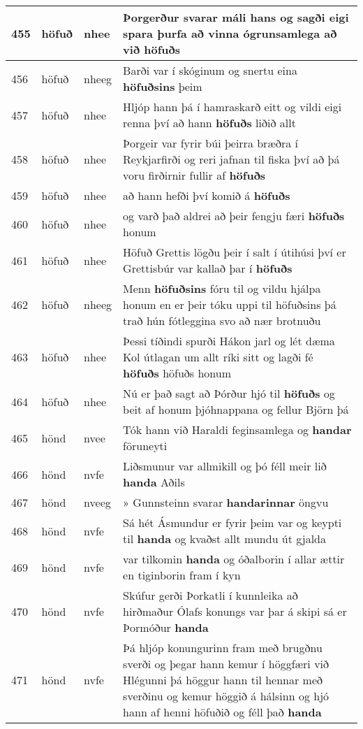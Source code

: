 \documentclass{article}
\begin{document}
\begin{longtable}{p{1cm}|p{1cm}|p{1cm}|p{13cm}}
\hline
455&höfuð&nhee&Þorgerður svarar máli hans og sagði eigi spara þurfa að vinna ógrunsamlega að við \textbf{höfuðs} \\
\hline
456&höfuð&nheeg&Barði var í skóginum og snertu eina \textbf{höfuðsins} þeim\\
\hline
457&höfuð&nhee&Hljóp hann þá í hamraskarð eitt og vildi eigi renna því að hann \textbf{höfuðs} liðið allt\\
\hline
458&höfuð&nhee&Þorgeir var fyrir búi þeirra bræðra í Reykjarfirði og reri jafnan til fiska því að þá voru firðirnir fullir af \textbf{höfuðs} \\
\hline
459&höfuð&nhee&að hann hefði því komið á \textbf{höfuðs} \\
\hline
460&höfuð&nhee&og varð það aldrei að þeir fengju færi \textbf{höfuðs} honum\\
\hline
461&höfuð&nhee&Höfuð Grettis lögðu þeir í salt í útihúsi því er Grettisbúr var kallað þar í \textbf{höfuðs} \\
\hline
462&höfuð&nheeg&Menn \textbf{höfuðsins} fóru til og vildu hjálpa honum en er þeir tóku uppi til höfuðsins þá trað hún fótleggina svo að nær brotnuðu\\
\hline
463&höfuð&nhee&Þessi tíðindi spurði Hákon jarl og lét dæma Kol útlagan um allt ríki sitt og lagði fé \textbf{höfuðs} höfuðs honum\\
\hline
464&höfuð&nhee&Nú er það sagt að Þórður hjó til \textbf{höfuðs} og beit af honum þjóhnappana og fellur Björn þá\\
\hline
465&hönd&nvee&Tók hann við Haraldi feginsamlega og \textbf{handar} föruneyti\\
\hline
466&hönd&nvfe&Liðsmunur var allmikill og þó féll meir lið \textbf{handa} Aðils\\
\hline
467&hönd&nveeg&» Gunnsteinn svarar \textbf{handarinnar} öngvu\\
\hline
468&hönd&nvfe&Sá hét Ásmundur er fyrir þeim var og keypti til \textbf{handa} og kvaðst allt mundu út gjalda\\
\hline
469&hönd&nvfe&var tilkomin \textbf{handa} og óðalborin í allar ættir en tiginborin fram í kyn\\
\hline
470&hönd&nvfe&Skúfur gerði Þorkatli í kunnleika að hirðmaður Ólafs konungs var þar á skipi sá er Þormóður \textbf{handa} \\
\hline
471&hönd&nvfe&Þá hljóp konungurinn fram með brugðnu sverði og þegar hann kemur í höggfæri við Hlégunni þá höggur hann til hennar með sverðinu og kemur höggið á hálsinn og hjó hann af henni höfuðið og féll það \textbf{handa} \\

\end{longtable}
\end{document}
